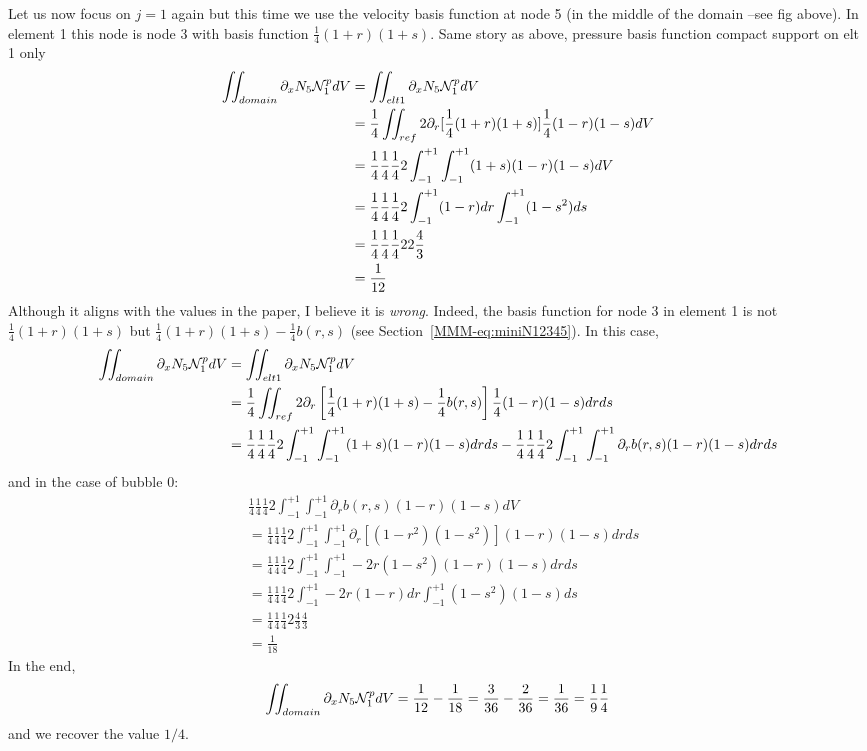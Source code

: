 Let us now focus on $j=1$ again but this time we use the 
velocity basis function at node 5 (in the middle of the domain --see fig above).
In element 1 this node is node 3 with basis function $\frac14(1+r)(1+s)$.
Same story as above, pressure basis function compact support on elt 1 only
\begin{align}
\iint_{domain} \partial_x N_5 {\mathcal{N}}_1^p dV
&= \iint_{elt1} \partial_x N_5 {\mathcal{N}}_1^p dV \\
&= \frac14 \iint_{ref} 2 \partial_r [\frac14(1+r)(1+s)] \frac14 (1-r)(1-s) dV \\
&= \frac14 \frac14 \frac14 2 \int_{-1}^{+1}   \int_{-1}^{+1} (1+s)  (1-r)(1-s) dV \\
&= \frac14 \frac14 \frac14 2 \int_{-1}^{+1} (1-r) dr \int_{-1}^{+1} (1-s^2) ds \\
&= \frac14 \frac14 \frac14 2 2 \frac43 \\
&= \frac{1}{12} 
\end{align}
Although it aligns with the values in the paper, I believe it is {\it wrong}. 
Indeed, the basis function for node 3 in element 1 is not $\frac14(1+r)(1+s)$
but $\frac14(1+r)(1+s)-\frac14 b(r,s)$ (see Section~\ref{MMM-eq:miniN12345}).
In this case, 
\begin{align}
\iint_{domain} \partial_x N_5 {\mathcal{N}}_1^p dV
&= \iint_{elt1} \partial_x N_5 {\mathcal{N}}_1^p dV \\
&= \frac14 \iint_{ref} 2 \partial_r \left[\frac14(1+r)(1+s) -\frac14b(r,s) \right] \frac14 (1-r)(1-s) dr ds \\
&=  \frac14 \frac14 \frac14 2 \int_{-1}^{+1} \int_{-1}^{+1} (1+s)  (1-r)(1-s) dr ds
- \frac14 \frac14 \frac14 2 \int_{-1}^{+1} \int_{-1}^{+1} \partial_r b(r,s) (1-r)(1-s) dr ds
\end{align}
and in the case of bubble 0:
\begin{align}
&\frac14 \frac14 \frac14 2 \int_{-1}^{+1} \int_{-1}^{+1} \partial_r b(r,s) (1-r)(1-s) dV \nonumber\\ 
&= \frac14 \frac14 \frac14 2 \int_{-1}^{+1} \int_{-1}^{+1} \partial_r [(1-r^2)(1-s^2)] (1-r)(1-s) dr ds \nonumber\\ 
&= \frac14 \frac14 \frac14 2 \int_{-1}^{+1} \int_{-1}^{+1} -2r(1-s^2) (1-r)(1-s) dr ds \nonumber\\ 
&= \frac14 \frac14 \frac14 2 \int_{-1}^{+1}  -2r(1-r)  dr \int_{-1}^{+1} (1-s^2) (1-s) ds \nonumber\\ 
&= \frac14 \frac14 \frac14 2 \frac43 \frac43 \nonumber\\
&= \frac{1}{18}
\end{align}
In the end, 
\[
\iint_{domain} \partial_x N_5 {\mathcal{N}}_1^p dV
= \frac{1}{12} - \frac{1}{18}
= \frac{3}{36} - \frac{2}{36} 
= \frac{1}{36}
= \frac{1}{9} \frac{1}{4}
\]
and we recover the value $1/4$. 

